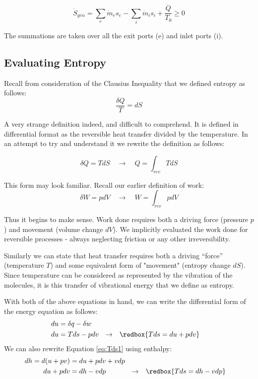 \begin{equation*}
  \dot{S}_{gen} = \sum_e \dot{m}_es_e - \sum_i \dot{m}_is_i + \frac{\dot{Q}}{T_0} \ge 0
\end{equation*}

The summations are taken over all the exit ports (e) and inlet ports (i).

\subsection{Evaluating Entropy}
Recall from consideration of the Clausius Inequality that we defined entropy as follows:
\begin{equation*}
  \frac{\delta Q}{T} = dS
\end{equation*}

A very strange definition indeed, and difficult to comprehend. It is defined in differential format as the reversible heat transfer divided by the temperature. In an attempt to try and understand it we rewrite the definition as follows:

\begin{equation*}
  \delta Q = T dS \quad\rightarrow\quad Q = \int_{rev} T dS
\end{equation*}

This form may look familiar.  Recall our earlier definition of work:
\begin{equation*}
  \delta W = p dV \quad\rightarrow\quad W = \int_{rev} p dV
\end{equation*}

Thus it begins to make sense. Work done requires both a driving force (pressure $p$) and movement (volume change $dV$). We implicitly evaluated the work done for reversible processes - always neglecting friction or any other irreversibility.

Similarly we can state that heat transfer requires both a driving ``force'' (temperature $T$) and some equivalent form of "movement" (entropy change $dS$). Since temperature can be considered as represented by the vibration of the molecules, it is this transfer of vibrational energy that we define as entropy.

With both of the above equations in hand, we can write the differential form of the energy equation as follows:
\begin{align}
  \nonumber du &= \delta q - \delta w  \\
  \label{eq:Tds1} du &= T ds - p dv  &\rightarrow& \quad \redbox{Tds = du + pdv}
\end{align}
We can also rewrite Equation \ref{eq:Tds1} using enthalpy:
\begin{align}
  \nonumber dh = d(u + pv) &= du + pdv + vdp \\
  \label{eq:Tds2} du + pdv &= dh - vdp &\rightarrow& \quad \redbox{Tds = dh - vdp}
\end{align}


